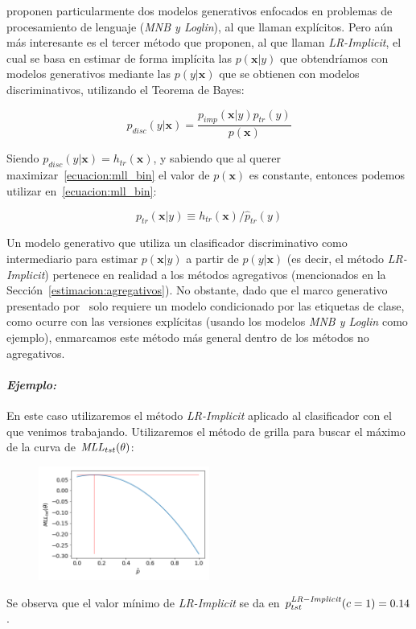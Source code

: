 \citet{keith2018uncertainty} proponen particularmente dos modelos generativos
enfocados en problemas de procesamiento de lenguaje ({\it MNB\/ y \it
Loglin\/}), al que llaman explícitos. Pero aún más interesante es el tercer
método que proponen, al que llaman {\it LR-Implicit}, el cual se basa en estimar
de forma implícita las \(p(\boldsymbol{x}|y)\) que obtendríamos con modelos
generativos mediante las \(p(y|\boldsymbol{x})\) que se obtienen con modelos
discriminativos, utilizando el Teorema de Bayes:

\begin{equation}\label{ecuacion:disc_gen}
    p_{disc}(y|\boldsymbol{x}) = \frac{p_{imp}(\boldsymbol{x}|y)p_{tr}(y)}{p(\boldsymbol{x})}
\end{equation}

Siendo \(p_{disc}(y|\boldsymbol{x})=h_{tr}(\boldsymbol{x})\), y sabiendo que al
querer maximizar~\ref{ecuacion:mll_bin} el valor de \(p(\boldsymbol{x})\) es
constante, entonces podemos utilizar en~\ref{ecuacion:mll_bin}:

\begin{equation}\label{ecuacion:disc_gen_2}
    p_{tr}(\boldsymbol{x}|y) \equiv h_{tr}(\boldsymbol{x}) / {\hat p_{tr}(y)}
\end{equation}

Un modelo generativo que utiliza un clasificador discriminativo como
intermediario para estimar \(p(\boldsymbol{x}|y)\) a partir de
\(p(y|\boldsymbol{x})\) (es decir, el método {\it LR-Implicit\/}) pertenece en
realidad a los métodos agregativos (mencionados en la
Sección~\ref{estimacion:agregativos}). No obstante, dado que el marco generativo
presentado por~\citet{keith2018uncertainty} solo requiere un modelo condicionado
por las etiquetas de clase, como ocurre con las versiones explícitas (usando los
modelos {\it MNB\/ y \it Loglin\/} como ejemplo), enmarcamos este método más
general dentro de los métodos no agregativos.

\paragraph{\it Ejemplo:\/} En este caso utilizaremos el método {\it LR-Implicit}
aplicado al clasificador con el que venimos trabajando. Utilizaremos el método
de grilla para buscar el máximo de la curva de \({\it MLL\/}_{tst}(\theta)\):
\begin{figure}[H]
    \centerline{\includegraphics[width=0.5\textwidth]{../plots_teoria/lr_implicit.png}}
    \caption{}\label{fig:lr_implicit}
\end{figure}

Se observa que el valor mínimo de {\it LR-Implicit} se da en \(p^{\it
LR-Implicit \/}_{tst}(c=1) = 0.14\).
